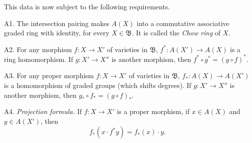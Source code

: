 {This data is now subject to the following requirements.

\hypertarget{axiom-A-A1}{}A1. The intersection pairing makes $A(X)$ into a commutative associative graded ring with identity, for every $X\in\mathfrak B$. It is called the \emph{Chow ring} of $X$.

\hypertarget{axiom-A-A2}{}A2. For any morphism $f\colon X\to X'$ of varieties in $\mathfrak B$, $f^*\colon A(X')\to A(X)$ is a ring homomorphism. If $g\colon X'\to X''$ is another morphism, then $f^*\circ g^*=(g\circ f)^*$.

\hypertarget{axiom-A-A3}{}A3. For any proper morphism $f\colon X\to X'$ of varieties in $\mathfrak B$, $f_*\colon A(X)\to A(X')$ is a homomorphism of graded groups (which shifts degrees). If $g\colon X'\to X''$ is another \EditionText{}morphism, then $g_*\circ f_*=(g\circ f)_*$.

\hypertarget{axiom-A-A4}{}A4. \emph{Projection formula.} If $f\colon X\to X'$ is a proper morphism, if $x\in A(X)$ and $y\in A(X')$, then
\[
f_*(x\cdot f^*y)=f_*(x)\cdot y.
\]
}

